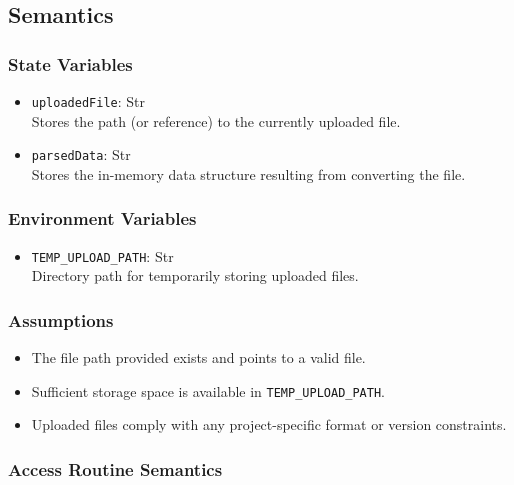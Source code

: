 \documentclass[12pt, titlepage]{article}
\begin{document}
\subsection{Semantics}

\subsubsection{State Variables}


\begin{itemize}
    \item \texttt{uploadedFile}: Str \\
     Stores the path (or reference) to the currently uploaded file.
    \item \texttt{parsedData}: Str \\ 
    Stores the in-memory data structure resulting from converting the file.
\end{itemize}

\subsubsection{Environment Variables}

\begin{itemize}
    \item \texttt{TEMP\_UPLOAD\_PATH}: Str \\
     Directory path for temporarily storing uploaded files.
\end{itemize}

\subsubsection{Assumptions}

\begin{itemize}
    \item The file path provided exists and points to a valid file.
    \item Sufficient storage space is available in \texttt{TEMP\_UPLOAD\_PATH}.
    \item Uploaded files comply with any project-specific format or version constraints.
\end{itemize}

\subsubsection{Access Routine Semantics}
\end{document}
